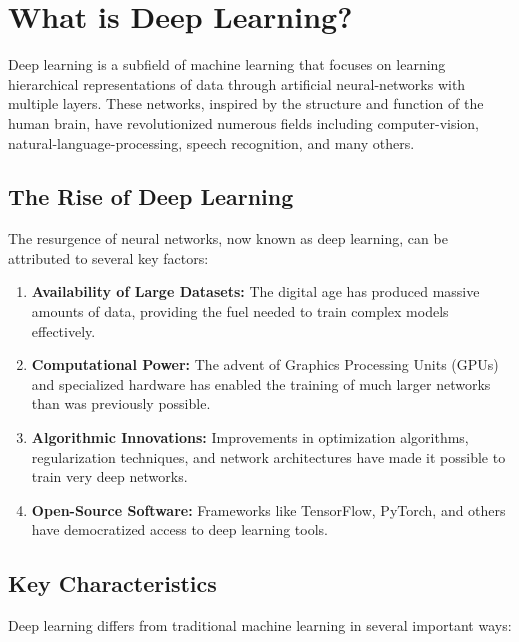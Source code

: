 
\section{What is Deep Learning? }
\label{sec:what-is-dl}

Deep learning is a subfield of machine learning that focuses on learning hierarchical representations of data through artificial \gls{neural-network}s with multiple layers. These networks, inspired by the structure and function of the human brain, have revolutionized numerous fields including \gls{computer-vision}, \gls{natural-language-processing}, speech recognition, and many others.

\subsection{The Rise of Deep Learning}

The resurgence of neural networks, now known as deep learning, can be attributed to several key factors:

\begin{enumerate}
    \item \textbf{Availability of Large Datasets:} The digital age has produced massive amounts of data, providing the fuel needed to train complex models effectively.
    
    \item \textbf{Computational Power:} The advent of Graphics Processing Units (GPUs) and specialized hardware has enabled the training of much larger networks than was previously possible.
    
    \item \textbf{Algorithmic Innovations:} Improvements in optimization algorithms, regularization techniques, and network architectures have made it possible to train very deep networks.
    
    \item \textbf{Open-Source Software:} Frameworks like TensorFlow, PyTorch, and others have democratized access to deep learning tools.
\end{enumerate}

\subsection{Key Characteristics}

Deep learning differs from traditional machine learning in several important ways:

